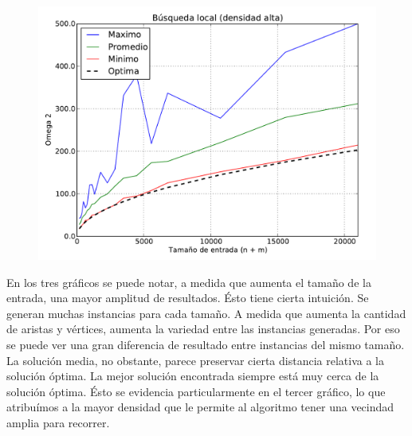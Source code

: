 \begin{figure}[H]
\begin{center}
\includegraphics[angle=0, scale=.75]{imagenes/calidad_local_search_2014-06-27_08-54-45.pdf}
\label{grafico local}
\end{center}
\end{figure}

En los tres gráficos se puede notar, a medida que aumenta el tamaño de la entrada, una mayor amplitud de resultados. Ésto tiene cierta intuición. 
Se generan muchas instancias para cada tamaño. A medida que aumenta la cantidad de aristas y vértices, aumenta la variedad entre las instancias
generadas. Por eso se puede ver una gran diferencia de resultado entre instancias del mismo tamaño.
La solución media, no obstante, parece preservar cierta distancia relativa a la solución óptima.
La mejor solución encontrada siempre está muy cerca de la solución óptima. Ésto se evidencia particularmente en el tercer gráfico, lo que
atribuímos a la mayor densidad que le permite al algoritmo tener una vecindad amplia para recorrer.
